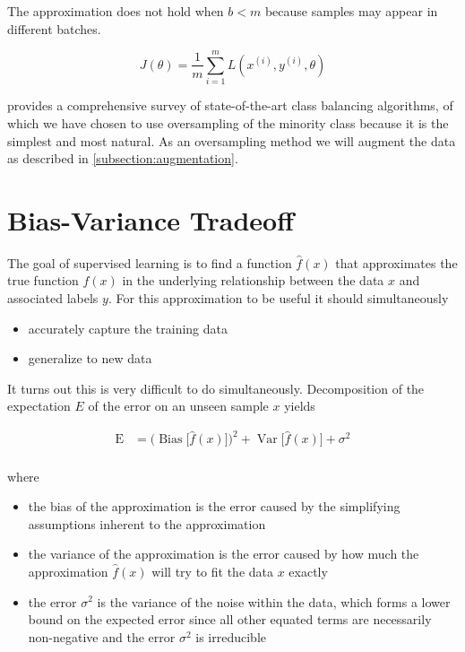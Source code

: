 The approximation does not hold when $b < m$ because samples may appear in different batches.

$$
J(\theta) = \frac{1}{m} \sum_{i=1}^{m} L(x^{(i)}, y^{(i)}, \theta)
$$

\cite{haibo2009} provides a comprehensive survey of state-of-the-art class balancing algorithms, of which we have chosen to use oversampling of the minority class because it is the simplest and most natural. As an oversampling method we will augment the data as described in \ref{subsection:augmentation}.

\section{Bias-Variance Tradeoff}

The goal of supervised learning is to find a function $\hat{f}(x)$ that approximates the true function $f(x)$ in the underlying relationship between the data $x$ and associated labels $y$. For this approximation to be useful it should simultaneously

\begin{itemize}
    \item accurately capture the training data
    \item generalize to new data
\end{itemize}

It turns out this is very difficult to do simultaneously. Decomposition of the expectation $E$ of the error on an unseen sample $x$ yields

$$
{\displaystyle {\begin{aligned}\operatorname {E} &={\Big (}\operatorname {Bias} {\big [}{\hat {f}}(x){\big ]}{\Big )}^{2}+\operatorname {Var} {\big [}{\hat {f}}(x){\big ]}+\sigma ^{2}\\\end{aligned}}}
$$

where

\begin{itemize}
    \item the bias of the approximation is the error caused by the simplifying assumptions inherent to the approximation
    \item the variance of the approximation is the error caused by how much the approximation $\hat{f}(x)$ will try to fit the data $x$ exactly
    \item the error $\sigma^2$ is the variance of the noise within the data, which forms a lower bound on the expected error since all other equated terms are necessarily non-negative and the error $\sigma^2$ is irreducible
\end{itemize}

